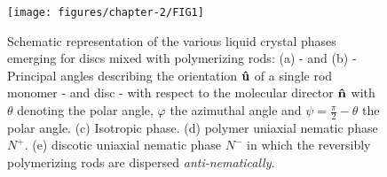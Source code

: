 \begin{figure}
  \texttt{[image: figures/chapter-2/FIG1]}
  \caption[Schematic representation of the various liquid crystal phases emerging for discs mixed with polymerizing rods]{Schematic representation of the various liquid crystal phases emerging for discs mixed with polymerizing rods: (a) - and (b) - Principal angles describing the orientation ${\bf \hat{u}}$ of a single rod monomer - and disc - with respect to the molecular director ${\bf \hat{n}}$  with $\theta$ denoting the polar angle, $\varphi$ the azimuthal angle and $\psi = \frac{\pi}{2} - \theta $ the polar angle.  (c) Isotropic phase. (d) polymer uniaxial nematic phase $N^+$. (e) discotic uniaxial nematic phase $N^-$ in which the reversibly polymerizing rods are dispersed {\em anti-nematically}.}
  \label{fig:cartoon}
\end{figure}

